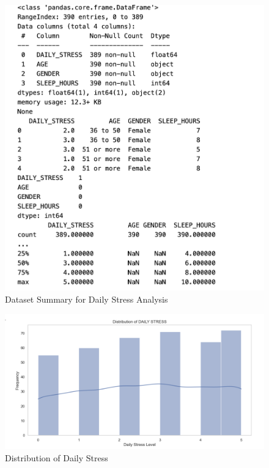 \documentclass[runningheads]{llncs}
\begin{document}
\begin{enumerate}
\begin{figure}
    \centering
    \includegraphics[width=.8\linewidth]{eda4.png}
    \caption{Dataset Summary for Daily Stress Analysis} 
    \label{fig:enter-label}
\end{figure}

\begin{figure}
    \centering
    \includegraphics[width=1.0\linewidth]{eda5.png}
    \caption{Distribution of Daily Stress} 
    \label{fig:enter-label}
\end{figure}


\end{enumerate}
\end{document}
